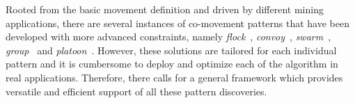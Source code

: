 %



Rooted from the basic movement definition and driven by different mining applications, there are several instances of co-movement patterns that have been developed with more advanced constraints, namely \emph{flock}~\cite{gudmundsson2006computing}, \emph{convoy}~\cite{jeung2008discovery}, \emph{swarm}~\cite{li2010swarm}, 
\emph{group}~\cite{wang2006grouppattern} and \emph{platoon}~\cite{li2015platoon}. 
However, these solutions are tailored for each individual pattern and it is cumbersome to deploy and optimize each of the algorithm in real applications. Therefore, there 
calls for a general framework which provides versatile and efficient support of all these pattern discoveries. 

